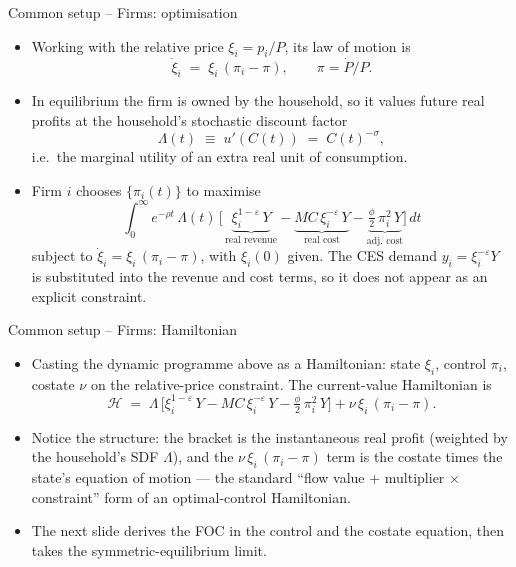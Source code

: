 \documentclass[11pt,aspectratio=169]{beamer}
\begin{document}
\begin{frame}{Common setup -- Firms: optimisation}

\begin{itemize}

\item Working with the relative price $\xi_i = p_i/P$, its law of
  motion is
  \[
  \dot\xi_i \;=\; \xi_i\,(\pi_i - \pi),
  \qquad \pi = \dot P / P.
  \]

\item In equilibrium the firm is owned by the household, so it values
  future real profits at the household's stochastic discount factor
  \[
  \Lambda(t) \;\equiv\; u'(C(t)) \;=\; C(t)^{-\sigma},
  \]
  i.e.\ the marginal utility of an extra real unit of consumption.\newline

\item Firm $i$ chooses $\{\pi_i(t)\}$ to maximise
  \[
  \int_0^\infty e^{-\rho t}\,\Lambda(t)\,\Big[\,
    \underbrace{\xi_i^{1-\varepsilon}\,Y}_{\text{real revenue}}
    -
    \underbrace{MC\,\xi_i^{-\varepsilon}\,Y}_{\text{real cost}}
    -
    \underbrace{\tfrac{\phi}{2}\,\pi_i^2\,Y}_{\text{adj.\ cost}}
  \Big]\,dt
  \]
  subject to $\dot\xi_i = \xi_i\,(\pi_i - \pi)$, with $\xi_i(0)$
  given. The CES demand $y_i = \xi_i^{-\varepsilon} Y$ is substituted
  into the revenue and cost terms, so it does not appear as an
  explicit constraint.

\end{itemize}

\end{frame}

\begin{frame}{Common setup -- Firms: Hamiltonian}

\begin{itemize}

\item Casting the dynamic programme above as a Hamiltonian: state
  $\xi_i$, control $\pi_i$, costate $\nu$ on the relative-price
  constraint. The current-value Hamiltonian is
  \[
  \mathcal H \;=\; \Lambda\,\Big[\xi_i^{1-\varepsilon}\,Y
  - MC\,\xi_i^{-\varepsilon}\,Y
  - \tfrac{\phi}{2}\,\pi_i^2\,Y\Big]
  + \nu\,\xi_i\,(\pi_i - \pi).
  \]

\item Notice the structure: the bracket is the instantaneous real
  profit (weighted by the household's SDF $\Lambda$), and the
  $\nu\,\xi_i\,(\pi_i - \pi)$ term is the costate times the state's
  equation of motion --- the standard ``flow value + multiplier $\times$
  constraint'' form of an optimal-control Hamiltonian.\newline

\item The next slide derives the FOC in the control and the costate
  equation, then takes the symmetric-equilibrium limit.

\end{itemize}

\end{frame}
\end{document}
